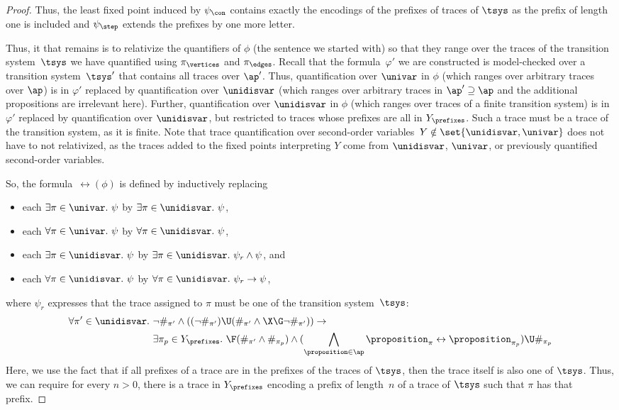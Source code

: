 \begin{proof}
Thus, the least fixed point induced by $\psi_\con$ contains exactly the encodings of the prefixes of traces of $\tsys$ as the prefix of length one is included and $\psi_\step$ extends the prefixes by one more letter.

Thus, it that remains is to relativize the quantifiers of $\phi$ (the sentence we started with) so that they range over the traces of the transition system~$\tsys$ we have quantified using $\pi_\vertices$ and $\pi_\edges$.
Recall that the formula~$\varphi'$ we are constructed is model-checked over a transition system~$\tsys'$ that contains all traces over $\ap'$.
Thus, quantification over $\univar$ in $\phi$ (which ranges over arbitrary traces over $\ap$) is in $\varphi'$ replaced by quantification over $\unidisvar$ (which ranges over arbitrary traces in $\ap' \supseteq \ap$ and the additional propositions are irrelevant here).
Further, quantification over $\unidisvar$ in $\phi$ (which ranges over traces of a finite transition system) is in $\varphi'$ replaced by quantification over $\unidisvar$, but restricted to traces whose prefixes are all in $Y_\prefixes$. 
Such a trace must be a trace of the transition system, as it is finite.
Note that trace quantification over second-order variables~$Y \notin \set{\unidisvar,\univar}$ does not have to not relativized, as the traces added to the fixed points interpreting $Y$ come from $\unidisvar$, $\univar$, or previously quantified second-order variables. 

So, the formula~$\rel(\phi)$ is defined by inductively replacing
\begin{itemize}
    \item each $\exists \pi \in \univar.\ \psi$ by $\exists \pi \in \unidisvar.\ \psi$, 
    
    \item each $\forall \pi \in \univar.\ \psi$ by $\forall \pi \in \unidisvar.\ \psi$, 
    
    \item each $\exists \pi \in \unidisvar.\ \psi$ by $\exists \pi \in \unidisvar.\ \psi_r \wedge \psi$, and 
    
    \item each $\forall \pi \in \unidisvar.\ \psi$ by $\forall \pi \in \unidisvar.\ \psi_r \rightarrow \psi$,
\end{itemize}
where $\psi_r$ expresses that the trace assigned to $\pi$ must be one of the transition system~$\tsys$:
\begin{align*}
\forall \pi' \in \unidisvar.\ {}&{} \neg\#_{\pi'} \wedge ((\neg\#_{\pi'})\U(\#_{\pi'}\wedge \X\G\neg \#_{\pi'})) \rightarrow \\
{}&{}\exists \pi_p\in Y_\prefixes.\ \F(\#_{\pi'} \wedge \#_{\pi_p}) \wedge (\bigwedge_{\proposition\in\ap} \proposition_{\pi} \leftrightarrow \proposition_{\pi_p})\U\#_{\pi_p}
\end{align*}
Here, we use the fact that if all prefixes of a trace are in the prefixes of the traces of $\tsys$, then the trace itself is also one of $\tsys$. Thus, we can require for every $n > 0$, 
there is a trace in $Y_\prefixes$ encoding a prefix of length~$n$ of a trace of $\tsys$ such that $\pi$ has that prefix. 


\end{proof}

